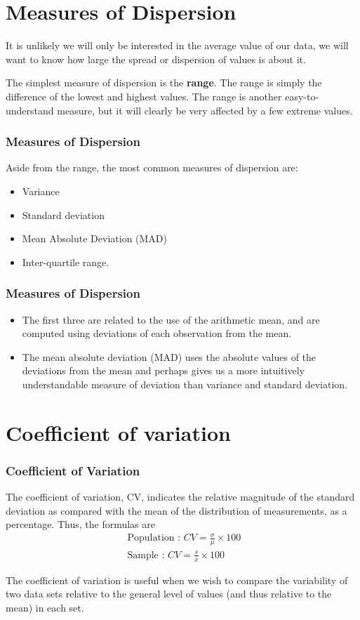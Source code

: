 \documentclass{beamer}
\begin{document}
\section{Measures of Dispersion}
\begin{frame}
It is unlikely we will only be interested in the average value of our data, we will want
to know how large the spread or dispersion of values is about it. 

\noindent The simplest measure of dispersion is the \textbf{range}.
The range is simply the difference of the lowest and highest values. The range is
another easy-to-understand measure, but it will clearly be very affected by a few
extreme values.
\end{frame}
\begin{frame}
\frametitle{Measures of Dispersion}
Aside from the range, the most common measures of dispersion are:
\begin{itemize}
\item Variance
\item Standard deviation
\item Mean Absolute Deviation (MAD)
\item Inter-quartile range.
\end{itemize}
\end{frame}
\begin{frame}
\frametitle{Measures of Dispersion}
\begin{itemize}
\item The first three are related to the use of the arithmetic mean, and are computed using deviations of each observation from the mean.
\item  The mean absolute deviation (MAD) uses the absolute values of the deviations from
the mean and perhaps gives us a more intuitively understandable measure of deviation than
variance and standard deviation.
\end{itemize} 
\end{frame}
\section{Coefficient of variation}
\begin{frame}
\frametitle{Coefficient of Variation}
The coefficient of variation, CV, indicates the relative magnitude of the standard deviation as compared
with the mean of the distribution of measurements, as a percentage. Thus, the formulas are
\begin{eqnarray*}
\mbox{ Population : } CV = \frac{\sigma}{\mu } \times 100 \\
\mbox{ Sample : } CV = \frac{s}{\bar{x}} \times 100
\end{eqnarray*}

The coefficient of variation is useful when we wish to compare the variability of two data sets relative to the
general level of values (and thus relative to the mean) in each set.
\end{frame}
\end{document}
